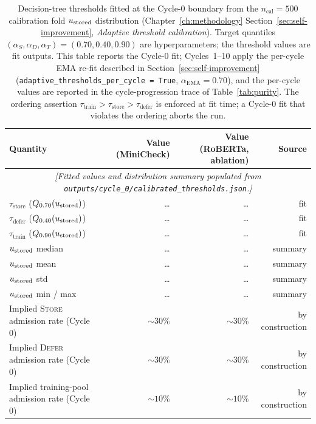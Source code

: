 \begin{table}[t]
\centering
\caption{Decision-tree thresholds fitted at the Cycle-0 boundary from the $n_{\text{cal}} = 500$ calibration fold $u_{\text{stored}}$ distribution (Chapter~\ref{ch:methodology} Section~\ref{sec:self-improvement}, \emph{Adaptive threshold calibration}). Target quantiles $(\alpha_{S}, \alpha_{D}, \alpha_{T}) = (0.70, 0.40, 0.90)$ are hyperparameters; the threshold values are fit outputs. This table reports the Cycle-0 fit; Cycles~1--10 apply the per-cycle EMA re-fit described in Section~\ref{sec:self-improvement} (\texttt{adaptive\_thresholds\_per\_cycle = True}, $\alpha_{\text{EMA}} = 0.70$), and the per-cycle values are reported in the cycle-progression trace of Table~\ref{tab:purity}. The ordering assertion $\tau_{\text{train}} > \tau_{\text{store}} > \tau_{\text{defer}}$ is enforced at fit time; a Cycle-0 fit that violates the ordering aborts the run.}
\label{tab:fitted-thresholds}
\small
\begin{tabular}{lrrr}
\toprule
Quantity & Value (MiniCheck) & Value (RoBERTa, ablation) & Source \\
\midrule
\multicolumn{4}{c}{\emph{[Fitted values and distribution summary populated from \texttt{outputs/cycle\_0/calibrated\_thresholds.json}.]}}\\
$\tau_{\text{store}}$ ($Q_{0.70}(u_{\text{stored}})$) & \ldots & \ldots & fit \\
$\tau_{\text{defer}}$ ($Q_{0.40}(u_{\text{stored}})$) & \ldots & \ldots & fit \\
$\tau_{\text{train}}$ ($Q_{0.90}(u_{\text{stored}})$) & \ldots & \ldots & fit \\
\midrule
$u_{\text{stored}}$ median & \ldots & \ldots & summary \\
$u_{\text{stored}}$ mean & \ldots & \ldots & summary \\
$u_{\text{stored}}$ std & \ldots & \ldots & summary \\
$u_{\text{stored}}$ min / max & \ldots & \ldots & summary \\
\midrule
Implied \textsc{Store} admission rate (Cycle 0) & $\sim 30\%$ & $\sim 30\%$ & by construction \\
Implied \textsc{Defer} admission rate (Cycle 0) & $\sim 30\%$ & $\sim 30\%$ & by construction \\
Implied training-pool admission rate (Cycle 0) & $\sim 10\%$ & $\sim 10\%$ & by construction \\
\bottomrule
\end{tabular}
\end{table}

